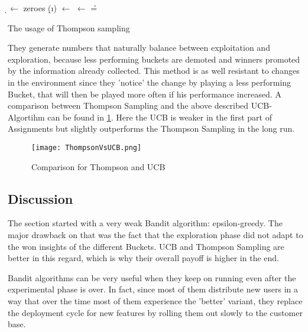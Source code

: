 \documentclass[main.tex]{subfiles}
\begin{document}
\begin{algorithm}
\KwIn{\b}
\BlankLine
\d $\leftarrow$ zeroes \;
{
\d(\i) $\leftarrow$ \draw{\b{\i}}
}
\nb $\leftarrow$ \max{\d} \;
\r = \rw{\nb}\;

\caption[Thompson Sampling]{The usage of Thompson sampling}
\label{alg:ThompsonSampling}
\end{algorithm}

They generate numbers that naturally balance between exploitation and exploration, because less performing buckets are demoted and winners promoted by the information already collected. This method is as well resistant to changes in the environment since they 'notice' the change by playing a less performing Bucket, that will then be played more often if his performance increased. A comparison between Thompson Sampling and the above described UCB-Algortihm can be found in \ref{fig:ThompsonVsUCB}. Here the UCB is weaker in the first part of Assignments but slightly outperforms the Thompson Sampling in the long run. 

\begin{figure}[ht]
\texttt{[image: ThompsonVsUCB.png]}
\centering
\caption{Comparison for Thompson and UCB}
\label{fig:ThompsonVsUCB}
\end{figure}

\subsection{Discussion}
The section started with a very weak Bandit algorithm: epsilon-greedy. The major drawback on that was the fact that the exploration phase did not adapt to the won insights of the different Buckets. UCB and Thompson Sampling are better in this regard, which is why their overall payoff is higher in the end. 

Bandit algorithms can be very useful when they keep on running even after the experimental phase is over. In fact, since most of them distribute new users in a way that over the time most of them experience the 'better' variant, they replace the deployment cycle for new features by rolling them out slowly to the customer base.
\end{document}
